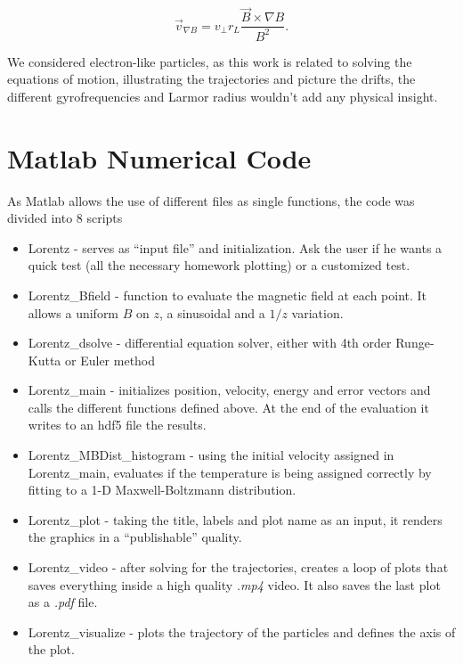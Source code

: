 \begin{equation}
\vec v_{\nabla B}=v_\perp r_L \frac{\vec B \times \nabla B}{B^2}.
\end{equation}

We considered electron-like particles, as this work is related to solving the equations of motion, illustrating the trajectories and picture the drifts, the different gyrofrequencies and Larmor radius wouldn't add any physical insight.


\section{Matlab Numerical Code}

As Matlab allows the use of different files as single functions, the code was divided into 8 scripts

\begin{itemize}
\item Lorentz - serves as ``input file'' and initialization. Ask the user if he wants a quick test (all the necessary homework plotting) or a customized test.
\item Lorentz\_Bfield - function to evaluate the magnetic field at each point. It allows a uniform $B$ on $z$, a sinusoidal and a $1/z$ variation.
\item Lorentz\_dsolve - differential equation solver, either with 4th order Runge-Kutta or Euler method
\item Lorentz\_main - initializes position, velocity, energy and error vectors and calls the different functions defined above. At the end of the evaluation it writes to an hdf5 file the results.
\item Lorentz\_MBDist\_histogram - using the initial velocity assigned in Lorentz\_main, evaluates if the temperature is being assigned correctly by fitting to a 1-D Maxwell-Boltzmann distribution.
\item Lorentz\_plot - taking the title, labels and plot name as an input, it renders the graphics in a ``publishable'' quality.
\item Lorentz\_video - after solving for the trajectories, creates a loop of plots that saves everything inside a high quality \textit{.mp4} video. It also saves the last plot as a \textit{.pdf} file.
\item Lorentz\_visualize - plots the trajectory of the particles and defines the axis of the plot.
\end{itemize}

